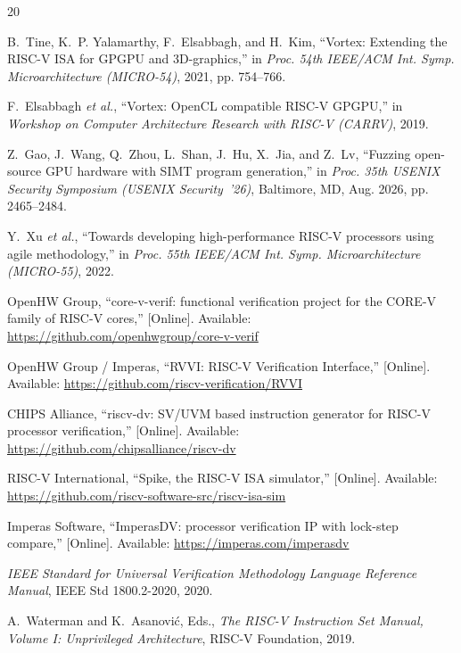\documentclass[conference]{IEEEtran}
\begin{document}
\balance
\begin{thebibliography}{20}

	B.~Tine, K.~P. Yalamarthy, F.~Elsabbagh, and H.~Kim,
	``Vortex: Extending the RISC-V ISA for GPGPU and 3D-graphics,''
	in \emph{Proc. 54th IEEE/ACM Int. Symp. Microarchitecture (MICRO-54)},
	2021, pp. 754--766.

	F.~Elsabbagh \emph{et al.},
	``Vortex: OpenCL compatible RISC-V GPGPU,''
	in \emph{Workshop on Computer Architecture Research with RISC-V
		(CARRV)}, 2019.

	Z.~Gao, J.~Wang, Q.~Zhou, L.~Shan, J.~Hu, X.~Jia, and Z.~Lv,
	``Fuzzing open-source GPU hardware with SIMT program generation,''
	in \emph{Proc. 35th USENIX Security Symposium (USENIX Security~'26)},
	Baltimore, MD, Aug. 2026, pp. 2465--2484.

	Y.~Xu \emph{et al.},
	``Towards developing high-performance RISC-V processors using agile
	methodology,'' in \emph{Proc. 55th IEEE/ACM Int. Symp.
		Microarchitecture (MICRO-55)}, 2022.

	OpenHW Group, ``core-v-verif: functional verification project for the
	CORE-V family of RISC-V cores,'' [Online]. Available:
	\url{https://github.com/openhwgroup/core-v-verif}

	OpenHW Group / Imperas, ``RVVI: RISC-V Verification Interface,''
	[Online]. Available: \url{https://github.com/riscv-verification/RVVI}

	CHIPS Alliance, ``riscv-dv: SV/UVM based instruction generator for
	RISC-V processor verification,'' [Online]. Available:
	\url{https://github.com/chipsalliance/riscv-dv}

	RISC-V International, ``Spike, the RISC-V ISA simulator,'' [Online].
	Available: \url{https://github.com/riscv-software-src/riscv-isa-sim}

	Imperas Software, ``ImperasDV: processor verification IP with
	lock-step compare,'' [Online]. Available:
	\url{https://imperas.com/imperasdv}

	\emph{IEEE Standard for Universal Verification Methodology Language
		Reference Manual}, IEEE Std 1800.2-2020, 2020.

	A.~Waterman and K.~Asanovi\'c, Eds., \emph{The RISC-V Instruction Set
		Manual, Volume I: Unprivileged Architecture}, RISC-V Foundation, 2019.


\end{thebibliography}
\end{document}
